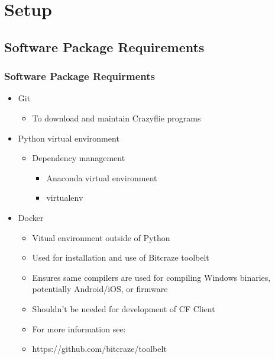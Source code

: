 \documentclass[t, xcolor=dvipsnames]{beamer} %
\begin{document}
\section{Setup}
\subsection{Software Package Requirements}
\begin{frame}
	\frametitle{Software Package Requirments}
	\begin{itemize}
		\item Git
			\begin{itemize}
				\item To download and maintain Crazyflie programs
			\end{itemize}
		\item Python virtual environment
			\begin{itemize}
				\item Dependency management
			\begin{itemize}
				\item Anaconda virtual environment
				\item virtualenv
			\end{itemize}
			\end{itemize}
		\item Docker
			\begin{itemize}
				\item Vitual environment outside of Python
				\item Used for installation and use of Bitcraze toolbelt
				\item Ensures same compilers are used for compiling Windows binaries, potentially Android/iOS, or firmware
				\item Shouldn't be needed for development of CF Client
				\item For more information see:
				\item https://github.com/bitcraze/toolbelt
			\end{itemize}
	\end{itemize}
\end{frame}
\end{document}
